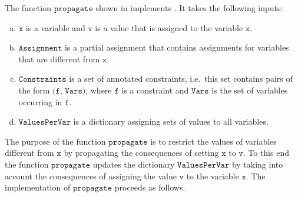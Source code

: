 \noindent
The function $\texttt{propagate}$ shown in  implements
.  It takes the following inputs:
\begin{enumerate}[(a)]
\item $\texttt{x}$ is a variable and $\texttt{v}$ is a value that is assigned to the variable $\texttt{x}$.
\item $\texttt{Assignment}$ is a partial assignment that contains assignments for variables that are
      different from $\texttt{x}$.
\item $\texttt{Constraints}$ is a set of annotated constraints, i.e.~this set contains pairs of the form 
      $\texttt{(f, Vars)}$, where $\texttt{f}$ is a constraint and $\texttt{Vars}$ is the set of
      variables occurring in $\texttt{f}$.
\item $\texttt{ValuesPerVar}$ is a dictionary assigning sets of values to all variables.
\end{enumerate}
The purpose of the function  $\texttt{propagate}$ is to restrict the values of variables different from
$\texttt{x}$  by propagating the consequences of setting $\texttt{x}$ to $\texttt{v}$.  To this end
the function $\texttt{propagate}$ updates the dictionary $\texttt{ValuesPerVar}$ by taking into account the
consequences of assigning the value $\texttt{v}$ to the variable $\texttt{x}$.  The implementation of
$\texttt{propagate}$ proceeds as follows.
